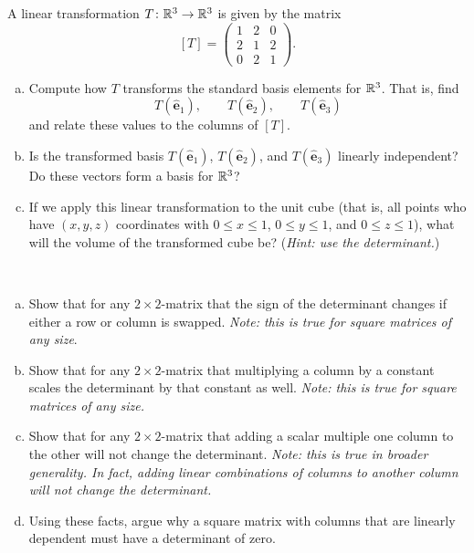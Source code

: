 \documentclass[12pt]{article} %
\newcommand{\ehat}{\boldsymbol{\hat{e}}}
\begin{document}
\begin{problem}
A linear transformation $T\colon \mathbb{R}^3 \to \mathbb{R}^3$ is given by the matrix
\[
[T]= \begin{pmatrix}
1& 2& 0\\
2& 1& 2\\
0& 2& 1
\end{pmatrix}.
\]
\begin{enumerate}[(a)]
    \item Compute how $T$ transforms the standard basis elements for $\mathbb{R}^3$. That is, find
    \[
    T(\ehat_1), \qquad
    T(\ehat_2), \qquad
    T(\ehat_3)
    \]
    and relate these values to the columns of $[T]$.
    \item Is the transformed basis $T(\ehat_1)$, $T(\ehat_2)$, and $T(\ehat_3)$ linearly independent? Do these vectors form a basis for $\mathbb{R}^3$?
    \item If we apply this linear transformation to the unit cube (that is, all points who have $(x,y,z)$ coordinates with $0\leq x \leq 1$, $0\leq y \leq 1$, and $0\leq z \leq 1$), what will the volume of the transformed cube be? (\emph{Hint: use the determinant.})
\end{enumerate}
\end{problem}

\begin{problem}~
\begin{enumerate}[(a)]
    \item Show that for any $2\times 2$-matrix that the sign of the determinant changes if either a row or column is swapped. \emph{Note: this is true for square matrices of any size}.
    \item Show that for any $2\times 2$-matrix that multiplying a column by a constant scales the determinant by that constant as well. \emph{Note: this is true for square matrices of any size.}
    \item Show that for any $2\times 2$-matrix that adding a scalar multiple one column to the other will not change the determinant. \emph{Note: this is true in broader generality. In fact, adding linear combinations of columns to another column will not change the determinant.}
    \item Using these facts, argue why a square matrix with columns that are linearly dependent must have a determinant of zero.
\end{enumerate}
\end{problem}
\end{document}
